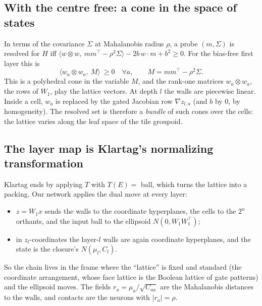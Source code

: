 \subsection{With the centre free: a cone in the space of states}
In terms of the covariance $\Sigma$ at Mahalanobis radius $\rho$, a probe $(m,\Sigma)$ is resolved for $H$ iff
$\langle w\otimes w,\ mm^\top-\rho^2\Sigma\rangle-2b\,w\cdot m+b^2\ge0$. For the bias-free first layer this is
\[
\big\langle w_a\otimes w_a,\ M\big\rangle\ \ge0\quad\forall a,\qquad M=mm^\top-\rho^2\Sigma .
\]
This is a polyhedral cone in the variable $M$, and the rank-one matrices $w_a\otimes w_a$, the rows of $W_1$, play the lattice vectors. At
depth $l$ the walls are piecewise linear. Inside a cell, $w_a$ is replaced by the gated Jacobian row $\nabla z_{l,a}$ (and $b$ by $0$, by
homogeneity). The resolved set is therefore a \emph{bundle} of such cones over the cells: the lattice varies along the leaf space of the
tile groupoid.

\subsection{The layer map is Klartag's normalizing transformation}
Klartag ends by applying $T$ with $T(E)=$ ball, which turns the lattice into a packing. Our network applies the dual move at every
layer:
\begin{itemize}[leftmargin=*]
\item $z=W_1x$ sends the walls to the coordinate hyperplanes, the cells to the $2^n$ orthants, and the input ball to the ellipsoid
$N(0,W_1W_1^\top)$;
\item in $z_l$-coordinates the layer-$l$ walls are again coordinate hyperplanes, and the state is the closure's $N(\mu_l,C_l)$.
\end{itemize}
So the chain lives in the frame where the ``lattice'' is fixed and standard (the coordinate arrangement, whose face lattice is the
Boolean lattice of gate patterns) and the ellipsoid moves. The fields $r_a=\mu_a/\sqrt{C_{aa}}$ are the Mahalanobis distances to the walls,
and contacts are the neurons with $|r_a|=\rho$.

